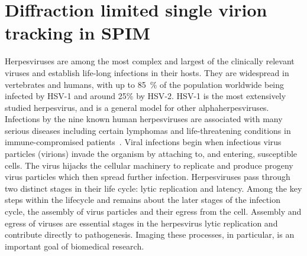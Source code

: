 \ifpdf
    \graphicspath{{Chapters/spt/Figs/Raster/}{Chapters/spt/Figs/PDF/}{Chapters/spt/Figs/}}
\else
    \graphicspath{{Chapters/spt/Figs/Vector/}{Chapters/spt/Figs/}}
\fi

\chapter{Diffraction limited single virion tracking in SPIM}\label{chapter:spt}


Herpesviruses are among the most complex and largest of the clinically relevant viruses and establish life-long infections in their hosts.
They are widespread in vertebrates and humans, with up to \SI{85}{\percent} of the population worldwide being infected by \gls{HSV}-1 and around 25\% by \gls{HSV}-2.
\gls{HSV}-1 is the most extensively studied herpesvirus, and is a general model for other alphaherpesviruses.
Infections by the nine known human herpesviruses are associated with many serious diseases including certain lymphomas and life-threatening conditions in immune-compromised patients~\cite{[1]}.
Viral infections begin when infectious virus particles (\gls{virion}s) invade the organism by attaching to, and entering, susceptible cells.
The virus hijacks the cellular machinery to replicate and produce progeny virus particles which then spread further infection.
Herpesviruses pass through two distinct stages in their life cycle: lytic replication and latency.
Among the key steps within the lifecycle and remains about the later
stages of the infection cycle, the assembly of virus particles and their egress from the cell.
Assembly and egress of viruses are essential stages in the herpesvirus lytic replication and contribute directly to pathogenesis.
Imaging these processes, in particular, is an important goal of biomedical research.

